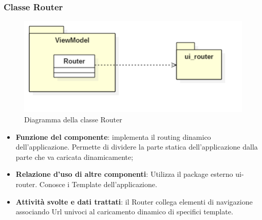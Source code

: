 \subsubsection{Classe Router}
\begin{figure}[h!]
\begin{center}
	\includegraphics[scale=0.65]{../images/Router.png}
	\caption{Diagramma della classe Router}
\end{center}
\end{figure}
\begin{itemize}
	\item\textbf{Funzione del componente}: implementa il routing dinamico dell'applicazione. Permette di dividere la parte statica dell'applicazione dalla parte che va caricata dinamicamente;
	\item\textbf{Relazione d'uso di altre componenti}: Utilizza il package esterno ui-router. Conosce i Template dell'applicazione.
	\item\textbf{Attività svolte e dati trattati}: il Router collega elementi di navigazione associando Url univoci al caricamento dinamico di specifici template.

\end{itemize}

\newpage